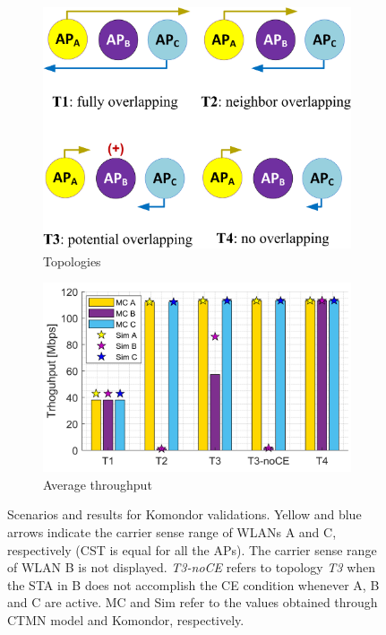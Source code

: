 \documentclass[a4paper]{article}
\begin{document}
	\begin{figure}
		\centering
		\begin{subfigure}{.5\textwidth}
			\centering
			\includegraphics[width=.75\linewidth]{images/scenario_III.png}
			\caption{Topologies}
			\label{fig:scenario_III}
		\end{subfigure}%
		\begin{subfigure}{.5\textwidth}
			\centering
			\includegraphics[width=0.95\linewidth]{images/scenario3_results_sfctmn_komondor.png}
			\caption{Average throughput}
			\label{fig:scenario3_results_sfctmn_komondor}
		\end{subfigure}
		\caption{Scenarios and results for Komondor validations. Yellow and blue arrows indicate the carrier sense range of WLANs A and C, respectively (CST is equal for all the APs). The carrier sense range of WLAN B is not displayed. \textit{T3-noCE} refers to topology \textit{T3} when the STA in B does not accomplish the CE condition whenever A, B and C are active. MC and Sim refer to the values obtained through CTMN model and Komondor, respectively.}
		\label{fig:scenario_III_all}
	\end{figure}
	
\end{document}
